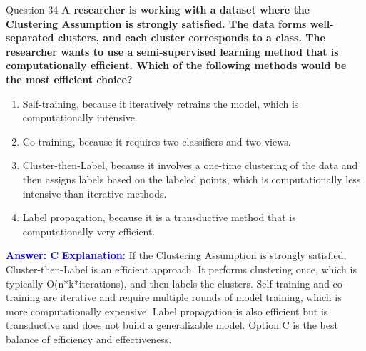 \documentclass[8pt]{beamer}  %
\begin{document}
	\begin{frame}{Question 34}
		\textbf{A researcher is working with a dataset where the Clustering Assumption is strongly satisfied. The data forms well-separated clusters, and each cluster corresponds to a class. The researcher wants to use a semi-supervised learning method that is computationally efficient. Which of the following methods would be the most efficient choice?}
		\begin{enumerate}
			\item Self-training, because it iteratively retrains the model, which is computationally intensive.
			\item Co-training, because it requires two classifiers and two views.
			\item Cluster-then-Label, because it involves a one-time clustering of the data and then assigns labels based on the labeled points, which is computationally less intensive than iterative methods.
			\item Label propagation, because it is a transductive method that is computationally very efficient.
		\end{enumerate}
		\vspace{0.2cm}
		\textcolor{blue}{\textbf{Answer: C}}
		\vspace{0.2cm}
		\textcolor{blue}{\textbf{Explanation:}} If the Clustering Assumption is strongly satisfied, Cluster-then-Label is an efficient approach. It performs clustering once, which is typically O(n*k*iterations), and then labels the clusters. Self-training and co-training are iterative and require multiple rounds of model training, which is more computationally expensive. Label propagation is also efficient but is transductive and does not build a generalizable model. Option C is the best balance of efficiency and effectiveness.
	\end{frame}
	
\end{document}
